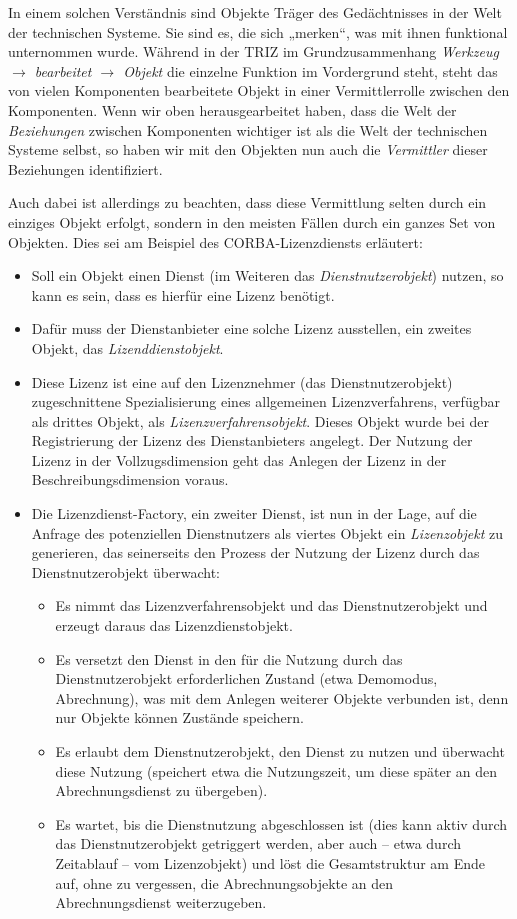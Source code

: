 \documentclass[11pt,a4paper]{article}
\begin{document}
In einem solchen Verständnis sind Objekte Träger des Gedächtnisses in der Welt
der technischen Systeme. Sie sind es, die sich „merken“, was mit ihnen
funktional unternommen wurde.  Während in der TRIZ im Grundzusammenhang
\emph{Werkzeug $\to$ bearbeitet $\to$ Objekt} die einzelne Funktion im
Vordergrund steht, steht das von vielen Komponenten bearbeitete Objekt in
einer Vermittlerrolle zwischen den Komponenten. Wenn wir oben herausgearbeitet
haben, dass die Welt  der \emph{Beziehungen} zwischen Komponenten wichtiger
ist als die Welt der technischen Systeme selbst, so haben wir mit den Objekten
nun auch die \emph{Vermittler} dieser Beziehungen identifiziert.

Auch dabei ist allerdings zu beachten, dass diese Vermittlung selten durch ein
einziges Objekt erfolgt, sondern in den meisten Fällen durch ein ganzes Set
von Objekten. Dies sei  am Beispiel des CORBA-Lizenzdiensts
\cite[S. 242]{Szyperski2002} erläutert:
\begin{itemize}
\item Soll ein Objekt einen Dienst (im Weiteren das \emph{Dienstnutzerobjekt})
  nutzen, so kann es sein, dass es hierfür eine Lizenz benötigt.
\item Dafür muss der Dienstanbieter eine solche Lizenz ausstellen, ein zweites
  Objekt, das \emph{Lizenddienstobjekt}.
\item Diese Lizenz ist eine auf den Lizenznehmer (das Dienstnutzerobjekt)
  zugeschnittene Spezialisierung eines allgemeinen Lizenzverfahrens, verfügbar
  als drittes Objekt, als \emph{Lizenzverfahrensobjekt}.  Dieses Objekt wurde
  bei der Registrierung der Lizenz des Dienstanbieters angelegt. Der Nutzung
  der Lizenz in der Vollzugsdimension geht das Anlegen der Lizenz in der
  Beschreibungsdimension voraus.
\item Die Lizenzdienst-Factory, ein zweiter Dienst, ist nun in der Lage, auf
  die Anfrage des potenziellen Dienstnutzers als viertes Objekt ein
  \emph{Lizenzobjekt} zu generieren, das seinerseits den Prozess der Nutzung
  der Lizenz durch das Dienstnutzerobjekt überwacht:
  \begin{itemize}
  \item Es nimmt das Lizenzverfahrensobjekt und das Dienstnutzerobjekt und
    erzeugt daraus das Lizenzdienstobjekt.
  \item Es versetzt den Dienst in den für die Nutzung durch das
    Dienstnutzerobjekt erforderlichen Zustand (etwa Demomodus, Abrechnung),
    was mit dem Anlegen weiterer Objekte verbunden ist, denn nur Objekte
    können Zustände speichern. 
  \item Es erlaubt dem Dienstnutzerobjekt, den Dienst zu nutzen und überwacht
    diese Nutzung (speichert etwa die Nutzungszeit, um diese später an den
    Abrechnungsdienst zu übergeben).
  \item Es wartet, bis die Dienstnutzung abgeschlossen ist (dies kann aktiv
    durch das Dienstnutzerobjekt getriggert werden, aber auch -- etwa durch
    Zeitablauf -- vom Lizenzobjekt) und löst die Gesamtstruktur am Ende auf,
    ohne zu vergessen, die Abrechnungsobjekte an den Abrechnungsdienst
    weiterzugeben.  
  \end{itemize}
\end{itemize}
\end{document}

